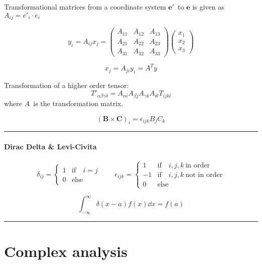 \documentclass[10pt,a4paper]{article}
\renewcommand{\b}{\textbf}
\newcommand{\infint}{\int_{-\infty}^{\infty}}
\newcommand{\holine}[1][\medskipamount]{\par\vspace*{\dimexpr-\parskip-\baselineskip+#1}\noindent\rule{\linewidth}{1pt}\par\vspace*{\dimexpr-\parskip-.5\baselineskip+#1}}
\newcommand{\Holine}[1][\medskipamount]{\par\vspace*{\dimexpr-\parskip-\baselineskip+#1}\noindent\rule{\linewidth}{3pt}\par\vspace*{\dimexpr-\parskip-.5\baselineskip+#1}}
\begin{document}
\begin{multicols}{2}
Transformational matrices from a coordinate system $\b{e}'$ to $\b{e}$ is given as $A_{ij} = e'_i \cdot e_i$

\[
    y_i = A_{ij}x_j =
    \begin{pmatrix}
        A_{11} & A_{12} & A_{13} \\
        A_{21} & A_{22} & A_{23} \\
        A_{31} & A_{32} & A_{33}
    \end{pmatrix}
    \begin{pmatrix}
        x_1 \\
        x_2 \\
        x_3
    \end{pmatrix}
\]

\[
    x_j = A_{ji}y_i = A^Ty
\]

Transformation of a higher order tensor:
\[
    T'_{\alpha\beta\gamma\delta} = A_{\alpha i}A_{\beta j}A_{\gamma k}A_{\delta l}T_{ijkl}
\]
where $A$ is the transformation matrix.


\[
    (\b{B}\times\b{C})_i = \epsilon_{ijk}B_jC_k
\]

\holine
\subsection*{Dirac Delta \& Levi-Civita}
\[
    \delta_{ij} = \begin{cases}
    1 &\text{if} \quad i=j \\
    0 &\text{else}
    \end{cases}
    \quad\quad
    \epsilon_{ijk} = \begin{cases}
    1 &\text{if} \quad i,j,k \ \text{in order} \\
    -1 &\text{if} \quad i,j,k \ \text{not in order} \\
    0 &\text{else}
    \end{cases}
\]

\[
    \infint \delta(x-a)f(x)\dd{x} = f(a)
\]







\Holine
\part*{Complex analysis}

\end{multicols}
\end{document}
